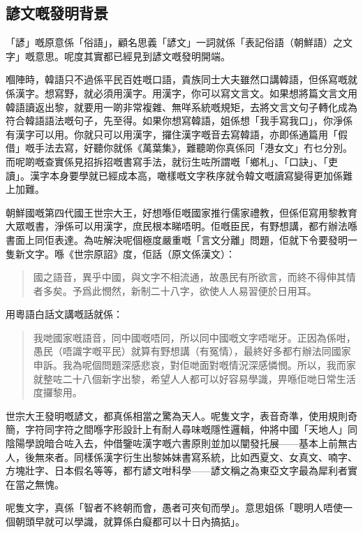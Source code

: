 \documentclass[a5paper, 10pt, openany]{book} %
\begin{document}
\subsection*{諺文嘅發明背景}

「諺」嘅原意係「俗語」，顧名思義「諺文」一詞就係「表記俗語（朝鮮語）之文字」嘅意思。呢度其實都已經見到諺文嘅發明開端。

嗰陣時，韓語只不過係平民百姓嘅口語，貴族同士大夫雖然口講韓語，但係寫嘅就係漢字。想寫野，就必須用漢字。用漢字，你可以寫文言文。如果想將篇文言文用韓語讀返出黎，就要用一啲非常複雜、無咩系統嘅規矩，去將文言文句子轉化成為符合韓語語法嘅句子，先至得。如果你想寫韓語，姐係想「我手寫我口」，你淨係有漢字可以用。你就只可以用漢字，攞住漢字嘅音去寫韓語，亦即係通篇用「假借」嘅手法去寫，好聽你就係《萬葉集》，難聽啲你真係同「港女文」冇乜分別。而呢啲嘅查實係見招拆招嘅書寫手法，就衍生咗所謂嘅「鄉札」、「口訣」、「吏讀」。漢字本身要學就已經成本高，噉樣嘅文字秩序就令韓文嘅讀寫變得更加係難上加難。

朝鮮國嘅第四代國王世宗大王，好想喺佢嘅國家推行儒家禮教，但係佢寫用黎教育大眾嘅書，淨係可以用漢字，庶民根本睇唔明。佢嘅臣民，有野想講，都冇辦法喺書面上同佢表達。為咗解決呢個極度嚴重嘅「言文分離」問題，佢就下令要發明一隻新文字。喺《世宗原詔》度，佢話（原文係漢文）：
\begin{quotation}
  國之語音，異乎中國，與文字不相流通，故愚民有所欲言，而終不得伸其情者多矣。予爲此憫然，新制二十八字，欲使人人易習便於日用耳。

\end{quotation}
用粵語白話文講嘅話就係：

\begin{quotation}
  我哋國家嘅語音，同中國嘅唔同，所以同中國嘅文字唔啱牙。正因為係咁，愚民（唔識字嘅平民）就算有野想講（有冤情），最終好多都冇辦法同國家申訴。我為呢個問題深感悲哀，對佢哋面對嘅情況深感憐憫。所以，我而家就整咗二十八個新字出黎，希望人人都可以好容易學識，畀喺佢哋日常生活度攞黎用。
\end{quotation}

世宗大王發明嘅諺文，都真係相當之驚為天人。呢隻文字，表音奇準，使用規則奇簡，字符同字符之間喺字形設計上有耐人尋味嘅隱性邏輯，仲將中國「天地人」同陰陽學說暗合咗入去，仲借鑒咗漢字嘅六書原則並加以闡發托展——基本上前無古人，後無來者。同樣係漢字衍生出黎姊妹書寫系統，比如西夏文、女真文、喃字、方塊壯字、日本假名等等，都冇諺文咁科學——諺文稱之為東亞文字最為犀利者實在當之無愧。

呢隻文字，真係「智者不終朝而會，愚者可夾旬而學」。意思姐係「聰明人唔使一個朝頭早就可以學識，就算係白癡都可以十日內搞掂」。
\end{document}
